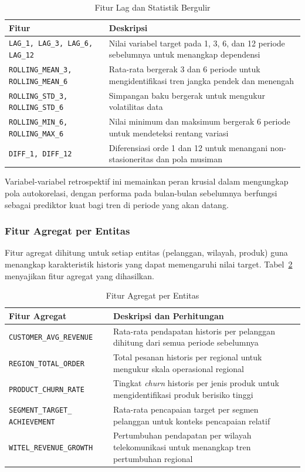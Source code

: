 \begin{table}[htbp]
\centering
\caption{Fitur Lag dan Statistik Bergulir}
\label{tab:fitur-lag}
\begin{tabular}{|p{4.5cm}|p{9cm}|}
\hline
\textbf{Fitur} & \textbf{Deskripsi} \\
\hline
\texttt{LAG\_1, LAG\_3, LAG\_6, LAG\_12} & Nilai variabel target pada 1, 3, 6, dan 12 periode sebelumnya untuk menangkap dependensi \\
\hline
\texttt{ROLLING\_MEAN\_3, ROLLING\_MEAN\_6} & Rata-rata bergerak 3 dan 6 periode untuk mengidentifikasi tren jangka pendek dan menengah \\
\hline
\texttt{ROLLING\_STD\_3, ROLLING\_STD\_6} & Simpangan baku bergerak untuk mengukur volatilitas data \\
\hline
\texttt{ROLLING\_MIN\_6, ROLLING\_MAX\_6} & Nilai minimum dan maksimum bergerak 6 periode untuk mendeteksi rentang variasi \\
\hline
\texttt{DIFF\_1, DIFF\_12} & Diferensiasi orde 1 dan 12 untuk menangani non-stasioneritas dan pola musiman \\
\hline
\end{tabular}
\end{table}

Variabel-variabel retrospektif ini memainkan peran krusial dalam mengungkap pola autokorelasi, dengan performa pada bulan-bulan sebelumnya berfungsi sebagai prediktor kuat bagi tren di periode yang akan datang.

\subsubsection{Fitur Agregat per Entitas}

Fitur agregat dihitung untuk setiap entitas (pelanggan, wilayah, produk) guna menangkap karakteristik historis yang dapat memengaruhi nilai target. Tabel~\ref{tab:fitur-agregat} menyajikan fitur agregat yang dihasilkan.

\begin{table}[htbp]
\centering
\caption{Fitur Agregat per Entitas}
\label{tab:fitur-agregat}
\begin{tabular}{|p{4.5cm}|p{9cm}|}
\hline
\textbf{Fitur Agregat} & \textbf{Deskripsi dan Perhitungan} \\
\hline
\texttt{CUSTOMER\_AVG\_REVENUE} & Rata-rata pendapatan historis per pelanggan dihitung dari semua periode sebelumnya \\
\hline
\texttt{REGION\_TOTAL\_ORDER} & Total pesanan historis per regional untuk mengukur skala operasional regional \\
\hline
\texttt{PRODUCT\_CHURN\_RATE} & Tingkat \textit{churn} historis per jenis produk untuk mengidentifikasi produk berisiko tinggi \\
\hline
\texttt{SEGMENT\_TARGET\_ ACHIEVEMENT} & Rata-rata pencapaian target per segmen pelanggan untuk konteks pencapaian relatif \\
\hline
\texttt{WITEL\_REVENUE\_GROWTH} & Pertumbuhan pendapatan per wilayah telekomunikasi untuk menangkap tren pertumbuhan regional \\
\hline
\end{tabular}
\end{table}

